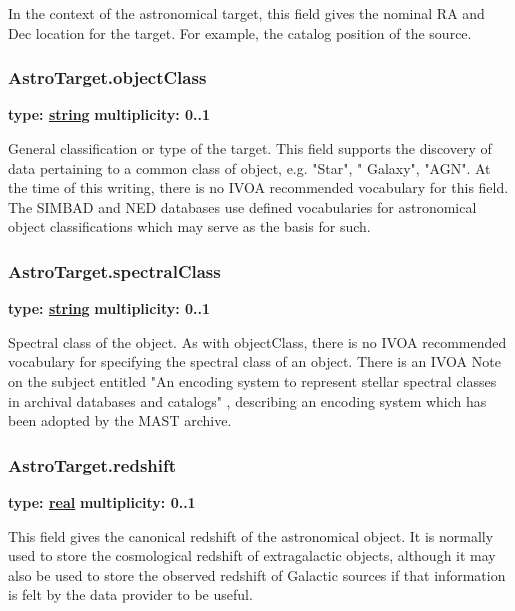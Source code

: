   In the context of the astronomical target, this field gives the nominal RA and
  Dec location for the target. For example, the catalog position of the
  source.  
  
  \subsubsection{AstroTarget.objectClass}
  \textbf{type: \hyperref[sect:ivoa]{string}} \newline
  \textbf{multiplicity: 0..1} \newline

  General classification or type of the target. This field supports the
  discovery of data pertaining to a common class of object, e.g. "Star", "
  Galaxy", "AGN". At the time of this writing, there is no IVOA recommended
  vocabulary for this field. The SIMBAD and NED databases use defined
  vocabularies for astronomical object classifications which may serve as the
  basis for such.
  
  \subsubsection{AstroTarget.spectralClass}
  \textbf{type: \hyperref[sect:ivoa]{string}} \newline
  \textbf{multiplicity: 0..1} \newline

  Spectral class of the object. As with objectClass, there is no IVOA
  recommended vocabulary for specifying the spectral class of an object. There
  is an IVOA Note on the subject entitled "An encoding system to represent
  stellar spectral classes in archival databases and catalogs" \citep{note:SpectralClasses},
  describing an encoding system which has been adopted by the MAST archive.  
  
  \subsubsection{AstroTarget.redshift}
  \textbf{type: \hyperref[sect:ivoa]{real}} \newline
  \textbf{multiplicity: 0..1} \newline

  This field gives the canonical redshift of the astronomical object. It is
  normally used to store the cosmological redshift of extragalactic objects,
  although it may also be used to store the observed redshift of Galactic
  sources if that information is felt by the data provider to be useful.  
  
